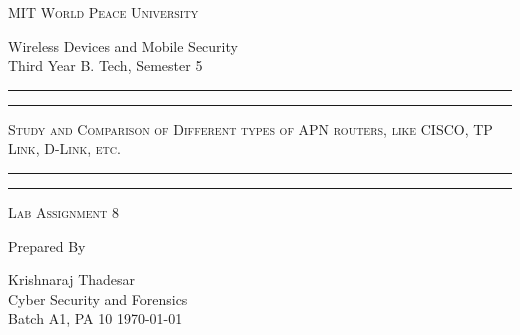 \documentclass[11pt]{article}
\begin{document}
\begin{titlepage}
  \centering


  \huge\textsc{
    MIT World Peace University
  }\\

  \vspace{0.75\baselineskip} %

  \LARGE{
    Wireless Devices and Mobile Security\\
    Third Year B. Tech, Semester 5
  }

  \vfill %


  \rule{\textwidth}{1.6pt}\vspace*{-\baselineskip}\vspace*{2pt}
  \rule{\textwidth}{0.6pt}
  \vspace{0.75\baselineskip} %

  \huge{\textsc{
      Study and Comparison of Different types of APN routers, like CISCO, TP Link, D-Link, etc.
    }} \\

  \vspace{0.5\baselineskip} %
  \rule{\textwidth}{0.6pt}\vspace*{-\baselineskip}\vspace*{2.8pt}
  \rule{\textwidth}{1.6pt}

  \vspace{1\baselineskip} %


  \LARGE\textsc{
    Lab Assignment 8
  } %
  \vfill


  Prepared By \vspace{0.5\baselineskip} %

  \Large{
    Krishnaraj Thadesar \\
    Cyber Security and Forensics\\
    Batch A1, PA 10
  }
  \vspace{0.5\baselineskip} %
  \today

\end{titlepage}
\end{document}
